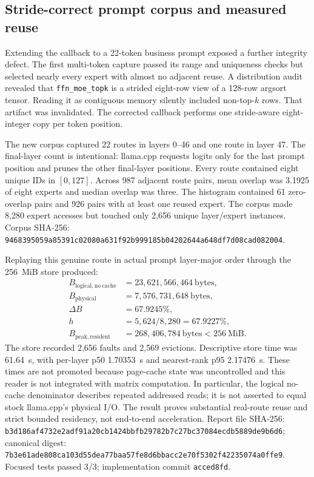 \subsection{Stride-correct prompt corpus and measured reuse}

Extending the callback to a 22-token business prompt exposed a further integrity
defect.  The first multi-token capture passed its range and uniqueness checks but
selected nearly every expert with almost no adjacent reuse.  A distribution audit
revealed that \texttt{ffn\_moe\_topk} is a strided eight-row view of a 128-row
argsort tensor.  Reading it as contiguous memory silently included non-top-$k$
rows.  That artifact was invalidated.  The corrected callback performs one
stride-aware eight-integer copy per token position.

The new corpus captured 22 routes in layers 0--46 and one route in layer 47.
The final-layer count is intentional: llama.cpp requests logits only for the last
prompt position and prunes the other final-layer positions.  Every route contained
eight unique IDs in $[0,127]$.  Across 987 adjacent route pairs, mean overlap was
3.1925 of eight experts and median overlap was three.  The histogram contained
61 zero-overlap pairs and 926 pairs with at least one reused expert.  The corpus
made 8{,}280 expert accesses but touched only 2{,}656 unique layer/expert
instances.  Corpus SHA-256:
\texttt{9468395059a85391c02080a631f92b999185b04202644a648df7d08cad082004}.

Replaying this genuine route in actual prompt layer-major order through the
256~MiB store produced:
\begin{align*}
 B_{\mathrm{logical,no\ cache}} &= 23{,}621{,}566{,}464\ \mathrm{bytes},\\
 B_{\mathrm{physical}} &= 7{,}576{,}731{,}648\ \mathrm{bytes},\\
 \Delta B &= 67.9245\%,\\
 h &= 5{,}624/8{,}280 = 67.9227\%,\\
 B_{\mathrm{peak,resident}} &= 268{,}406{,}784\ \mathrm{bytes}
 < 256\ \mathrm{MiB}.
\end{align*}
The store recorded 2{,}656 faults and 2{,}569 evictions.  Descriptive store time
was 61.64~s, with per-layer p50 1.70353~s and nearest-rank p95 2.17476~s.
These times are not promoted because page-cache state was uncontrolled and this
reader is not integrated with matrix computation.  In particular, the logical
no-cache denominator describes repeated addressed reads; it is not asserted to
equal stock llama.cpp's physical I/O.  The result proves substantial real-route
reuse and strict bounded residency, not end-to-end acceleration.  Report file
SHA-256:
\texttt{b3d186af4732e2adf91a20cb1424bbfb29782b7c27bc37084ecdb5889de9b6d6};
canonical digest:
\texttt{7b3e61ade808ca103d55dea77baa57fe8d6bbacc2e70f5302f42235074a0ffe9}.
Focused tests passed 3/3; implementation commit \texttt{acced8fd}.

